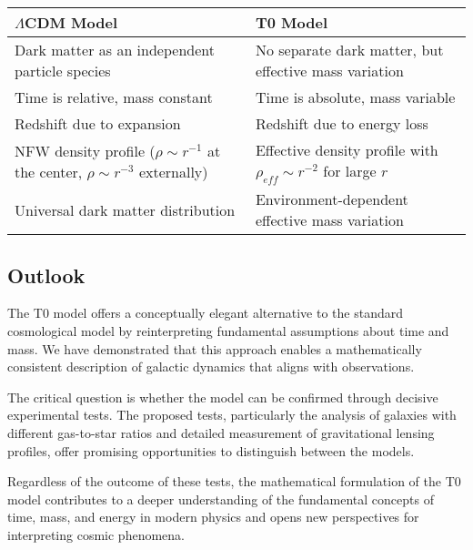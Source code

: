 \documentclass[a4paper,12pt]{article}
\begin{document}
	\begin{tcolorbox}[colback=yellow!5!white,colframe=yellow!75!black,title=Model Comparison]
		\begin{tabular}{|p{}|p{}|}
			\hline
			\textbf{$\Lambda$CDM Model} & \textbf{T0 Model} \\
			\hline
			Dark matter as an independent particle species & No separate dark matter, but effective mass variation \\
			\hline
			Time is relative, mass constant & Time is absolute, mass variable \\
			\hline
			Redshift due to expansion & Redshift due to energy loss \\
			\hline
			NFW density profile ($\rho \sim r^{-1}$ at the center, $\rho \sim r^{-3}$ externally) & Effective density profile with $\rho_{eff} \sim r^{-2}$ for large $r$ \\
			\hline
			Universal dark matter distribution & Environment-dependent effective mass variation \\
			\hline
		\end{tabular}
	\end{tcolorbox}
	
	\subsection{Outlook}
	
	The T0 model offers a conceptually elegant alternative to the standard cosmological model by reinterpreting fundamental assumptions about time and mass. We have demonstrated that this approach enables a mathematically consistent description of galactic dynamics that aligns with observations.
	
	The critical question is whether the model can be confirmed through decisive experimental tests. The proposed tests, particularly the analysis of galaxies with different gas-to-star ratios and detailed measurement of gravitational lensing profiles, offer promising opportunities to distinguish between the models.
	
	Regardless of the outcome of these tests, the mathematical formulation of the T0 model contributes to a deeper understanding of the fundamental concepts of time, mass, and energy in modern physics and opens new perspectives for interpreting cosmic phenomena.
	
\end{document}
